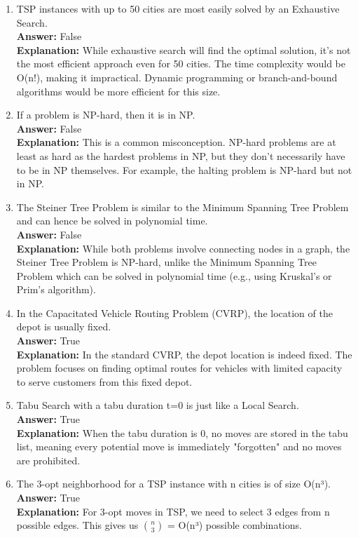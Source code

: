 \begin{enumerate}[label=\alph*)]
\item TSP instances with up to 50 cities are most easily solved by an Exhaustive Search.\\
\textbf{Answer:} False\\
\textbf{Explanation:} While exhaustive search will find the optimal solution, it's not the most efficient approach even for 50 cities. The time complexity would be O(n!), making it impractical. Dynamic programming or branch-and-bound algorithms would be more efficient for this size.

\item If a problem is NP-hard, then it is in NP.\\
\textbf{Answer:} False\\
\textbf{Explanation:} This is a common misconception. NP-hard problems are at least as hard as the hardest problems in NP, but they don't necessarily have to be in NP themselves. For example, the halting problem is NP-hard but not in NP.

\item The Steiner Tree Problem is similar to the Minimum Spanning Tree Problem and can hence be solved in polynomial time.\\
\textbf{Answer:} False\\
\textbf{Explanation:} While both problems involve connecting nodes in a graph, the Steiner Tree Problem is NP-hard, unlike the Minimum Spanning Tree Problem which can be solved in polynomial time (e.g., using Kruskal's or Prim's algorithm).

\item In the Capacitated Vehicle Routing Problem (CVRP), the location of the depot is usually fixed.\\
\textbf{Answer:} True\\
\textbf{Explanation:} In the standard CVRP, the depot location is indeed fixed. The problem focuses on finding optimal routes for vehicles with limited capacity to serve customers from this fixed depot.

\item Tabu Search with a tabu duration t=0 is just like a Local Search.\\
\textbf{Answer:} True\\
\textbf{Explanation:} When the tabu duration is 0, no moves are stored in the tabu list, meaning every potential move is immediately "forgotten" and no moves are prohibited.

\item The 3-opt neighborhood for a TSP instance with n cities is of size O(n³).\\
\textbf{Answer:} True\\
\textbf{Explanation:} For 3-opt moves in TSP, we need to select 3 edges from n possible edges. This gives us \(\binom{n}{3}\) = O(n³) possible combinations.


\end{enumerate}
